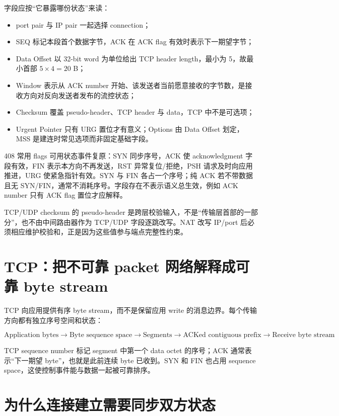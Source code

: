 \documentclass[UTF8,fontset=none,11pt,a4paper]{ctexart}
\providecommand{\tightlist}{\setlength{\itemsep}{0pt}\setlength{\parskip}{0pt}}
\begin{document}
字段应按“它暴露哪份状态”来读：
\begin{itemize}
\tightlist
\item port pair 与 IP pair 一起选择 connection；
\item SEQ 标记本段首个数据字节，ACK 在 ACK flag 有效时表示下一期望字节；
\item Data Offset 以 32-bit word 为单位给出 TCP header length，最小为 5，故最小首部 $5\times4=20$ B；
\item Window 表示从 ACK number 开始、该发送者当前愿意接收的字节数，是接收方向对反向发送者发布的流控状态；
\item Checksum 覆盖 pseudo-header、TCP header 与 data，TCP 中不是可选项；
\item Urgent Pointer 只有 URG 置位才有意义；Options 由 Data Offset 划定，MSS 是建连时常见选项而非固定基础字段。
\end{itemize}

408 常用 flags 可用状态事件复原：SYN 同步序号，ACK 使 acknowledgment 字段有效，FIN 表示本方向不再发送，RST 异常复位/拒绝，PSH 请求及时向应用推进，URG 使紧急指针有效。SYN 与 FIN 各占一个序号；纯 ACK 若不带数据且无 SYN/FIN，通常不消耗序号。字段存在不表示语义总生效，例如 ACK number 只有 ACK flag 置位才应解释。

TCP/UDP checksum 的 pseudo-header 是跨层校验输入，不是“传输层首部的一部分”，也不由中间路由器作为 TCP/UDP 字段逐跳改写。NAT 改写 IP/port 后必须相应维护校验和，正是因为这些值参与端点完整性约束。

\section{TCP：把不可靠 packet 网络解释成可靠 byte
stream}\label{4-tcpux628aux4e0dux53efux9760-packet-ux7f51ux7edcux89e3ux91caux6210ux53efux9760-byte-stream}

TCP 向应用提供有序 byte stream，而不是保留应用 write
的消息边界。每个传输方向都有独立序号空间和状态：

\[
\boxed{
\text{Application bytes}
\to \text{Byte sequence space}
\to \text{Segments}
\to \text{ACKed contiguous prefix}
\to \text{Receive byte stream}
}
\]

TCP sequence number 标记 segment 中第一个 data octet 的序号；ACK
通常表示``下一期望 byte''，也就是此前连续 byte 已收到。SYN 和 FIN 也占用
sequence space，这使控制事件能与数据一起被可靠排序。

\section{为什么连接建立需要同步双方状态}\label{5-ux4e3aux4ec0ux4e48ux8fdeux63a5ux5efaux7acbux9700ux8981ux540cux6b65ux53ccux65b9ux72b6ux6001}
\end{document}

